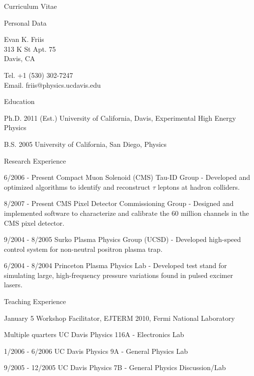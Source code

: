\documentclass[12pt]{amsart}
\title{}
\author{}
\date{} %
\begin{document}
\begin{cv}{Curriculum Vitae}

\begin{cvlist}{Personal Data}
\item Evan K. Friis\\
313 K St Apt. 75\\
Davis, CA

\item Tel. +1 (530) 302-7247\\
Email. friis@physics.ucdavis.edu
\end{cvlist}

\begin{cvlist}{Education}
\item[Ph.D. 2011 (Est.)] University of California, Davis, Experimental High Energy Physics
\item[B.S. 2005] University of California, San Diego, Physics
\end{cvlist}

\begin{cvlist}{Research Experience}
\item[6/2006 - Present] Compact Muon Solenoid (CMS) Tau-ID Group - Developed and optimized algorithms to identify and reconstruct $\tau$ leptons at hadron colliders.
\item[8/2007 - Present] CMS Pixel Detector Commissioning Group - Designed and implemented software to characterize and calibrate the 60 million channels in the CMS pixel detector.
\item[9/2004 - 8/2005] Surko Plasma Physics Group (UCSD) - Developed high-speed control system for non-neutral positron plasma trap.
\item[6/2004 - 8/2004] Princeton Plasma Physics Lab - Developed test stand for simulating large, high-frequency pressure variations found in pulsed excimer lasers.
\end{cvlist}

\begin{cvlist}{Teaching Experience}
\item[January 5] Workshop Facilitator, EJTERM 2010, Fermi National Laboratory
\item[Multiple quarters] UC Davis Physics 116A - Electronics Lab
\item[1/2006 - 6/2006] UC Davis Physics 9A - General Physics Lab
\item[9/2005 - 12/2005] UC Davis Physics 7B - General Physics Discussion/Lab
\end{cvlist}


\end{cv}
\end{document}
